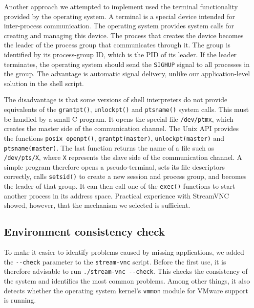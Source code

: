 Another approach we attempted to implement used the terminal functionality provided by the operating system. A terminal is a special device intended for inter-process communication. The operating system provides system calls for creating and managing this device. The process that creates the device becomes the leader of the process group that communicates through it. The group is identified by its process-group ID, which is the PID of its leader. If the leader terminates, the operating system should send the \verb|SIGHUP| signal to all processes in the group. The advantage is automatic signal delivery, unlike our application-level solution in the shell script.

The disadvantage is that some versions of shell interpreters do not provide equivalents of the \verb|grantpt()|, \verb|unlockpt()| and \verb|ptsname()| system calls. This must be handled by a small C program. It opens the special file \verb|/dev/ptmx|, which creates the master side of the communication channel. The Unix API provides the functions \verb|posix_openpt()|, \verb|grantpt(master)|, \verb|unlockpt(master)| and \verb|ptsname(master)|. The last function returns the name of a file such as \verb|/dev/pts/X|, where \verb|X| represents the slave side of the communication channel. A simple program therefore opens a pseudo-terminal, sets its file descriptors correctly, calls \verb|setsid()| to create a new session and process group, and becomes the leader of that group. It can then call one of the \verb|exec()| functions to start another process in its address space. Practical experience with StreamVNC showed, however, that the mechanism we selected is sufficient.

\subsection{Environment consistency check}
To make it easier to identify problems caused by missing applications, we added the \verb|--check| parameter to the \verb|stream-vnc| script. Before the first use, it is therefore advisable to run \verb|./stream-vnc --check|. This checks the consistency of the system and identifies the most common problems. Among other things, it also detects whether the operating system kernel's \verb|vmmon| module for VMware support is running.

\proofed

